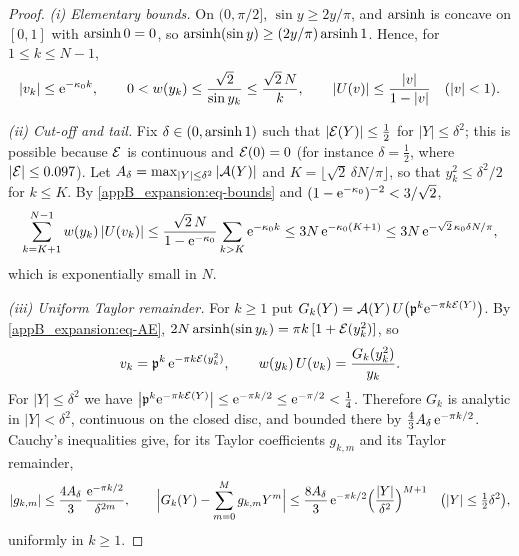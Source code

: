 \begin{proof}
\emph{(i) Elementary bounds.} On $(0,\pi/2]$, $\sin y\ge2y/\pi$, and $\operatorname{arsinh}$ is concave on $[0,1]$ with
$\operatorname{arsinh}0=0$, so $\operatorname{arsinh}(\sin y)\ge(2y/\pi)\operatorname{arsinh}1$. Hence, for $1\le k\le N-1$,
\begin{equation}\label{appB_expansion:eq-bounds}
  |v_k|\le\mathrm{e}^{-\kappa_0k},\qquad 0<w(y_k)\le\frac{\sqrt2}{\sin y_k}\le\frac{\sqrt2\,N}{k},\qquad
  |U(v)|\le\frac{|v|}{1-|v|}\quad(|v|<1).
\end{equation}

\emph{(ii) Cut-off and tail.} Fix $\delta\in(0,\operatorname{arsinh}1)$ such that $|\mathcal{E}(Y)|\le\tfrac12$ for $|Y|\le\delta^{2}$;
this is possible because $\mathcal{E}$ is continuous and $\mathcal{E}(0)=0$ (for instance $\delta=\tfrac12$, where
$|\mathcal{E}|\le0.097$). %
Let $A_\delta=\max_{|Y|\le\delta^{2}}|\mathcal{A}(Y)|$ and $K=\lfloor\sqrt2\,\delta N/\pi\rfloor$, so that
$y_k^{2}\le\delta^{2}/2$ for $k\le K$. By \eqref{appB_expansion:eq-bounds} and
$(1-\mathrm{e}^{-\kappa_0})^{-2}<3/\sqrt2$,
\begin{equation}\label{appB_expansion:eq-tail}
  \sum_{k=K+1}^{N-1}w(y_k)\,|U(v_k)|\le\frac{\sqrt2\,N}{1-\mathrm{e}^{-\kappa_0}}\sum_{k>K}\mathrm{e}^{-\kappa_0k}
  \le3N\,\mathrm{e}^{-\kappa_0(K+1)}\le3N\,\mathrm{e}^{-\sqrt2\,\kappa_0\delta N/\pi},
\end{equation}
which is exponentially small in $N$.

\emph{(iii) Uniform Taylor remainder.} For $k\ge1$ put
$G_k(Y)=\mathcal{A}(Y)\,U\bigl(\mathfrak{p}^{k}\mathrm{e}^{-\pi k\mathcal{E}(Y)}\bigr)$. By \eqref{appB_expansion:eq-AE},
$2N\operatorname{arsinh}(\sin y_k)=\pi k\,[1+\mathcal{E}(y_k^{2})]$, so
\begin{equation}\label{appB_expansion:eq-Gk}
  v_k=\mathfrak{p}^{k}\,\mathrm{e}^{-\pi k\mathcal{E}(y_k^{2})},\qquad w(y_k)\,U(v_k)=\frac{G_k(y_k^{2})}{y_k}.
\end{equation}
For $|Y|\le\delta^{2}$ we have $\bigl|\mathfrak{p}^{k}\mathrm{e}^{-\pi k\mathcal{E}(Y)}\bigr|\le\mathrm{e}^{-\pi k/2}\le\mathrm{e}^{-\pi/2}<\tfrac14$.
Therefore $G_k$ is analytic in $|Y|<\delta^{2}$, continuous on the closed disc, and bounded there by
$\tfrac43A_\delta\,\mathrm{e}^{-\pi k/2}$. Cauchy's inequalities give, for its Taylor coefficients $g_{k,m}$ and its
Taylor remainder,
\begin{equation}\label{appB_expansion:eq-cauchy}
  |g_{k,m}|\le\frac{4A_\delta}{3}\,\frac{\mathrm{e}^{-\pi k/2}}{\delta^{2m}},\qquad
  \Bigl|G_k(Y)-\sum_{m=0}^{M}g_{k,m}Y^{m}\Bigr|\le\frac{8A_\delta}{3}\,\mathrm{e}^{-\pi k/2}\Bigl(\frac{|Y|}{\delta^{2}}\Bigr)^{M+1}
  \quad\bigl(|Y|\le\tfrac12\delta^{2}\bigr),
\end{equation}
uniformly in $k\ge1$.


\end{proof}
